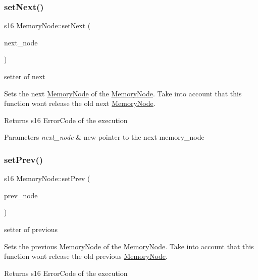 \subsubsection{\texorpdfstring{set\+Next()}{setNext()}}
{\footnotesize\ttfamily s16 Memory\+Node\+::set\+Next (\begin{DoxyParamCaption}\item[{\hyperlink{class_memory_node}{Memory\+Node} $\ast$}]{next\+\_\+node }\end{DoxyParamCaption})}



setter of next 

Sets the next \hyperlink{class_memory_node}{Memory\+Node} of the \hyperlink{class_memory_node}{Memory\+Node}. Take into account that this function won\textquotesingle{}t release the old next \hyperlink{class_memory_node}{Memory\+Node}.

\begin{DoxyReturn}{Returns}
s16 Error\+Code of the execution 
\end{DoxyReturn}

\begin{DoxyParams}{Parameters}
{\em next\+\_\+node} & new pointer to the next memory\+\_\+node \\
\hline
\end{DoxyParams}
\mbox{\label{class_memory_node_a3370c238a8a995f0cd34a84c2180c654}} 
\subsubsection{\texorpdfstring{set\+Prev()}{setPrev()}}
{\footnotesize\ttfamily s16 Memory\+Node\+::set\+Prev (\begin{DoxyParamCaption}\item[{\hyperlink{class_memory_node}{Memory\+Node} $\ast$}]{prev\+\_\+node }\end{DoxyParamCaption})}



setter of previous 

Sets the previous \hyperlink{class_memory_node}{Memory\+Node} of the \hyperlink{class_memory_node}{Memory\+Node}. Take into account that this function won\textquotesingle{}t release the old previous \hyperlink{class_memory_node}{Memory\+Node}.

\begin{DoxyReturn}{Returns}
s16 Error\+Code of the execution 
\end{DoxyReturn}

